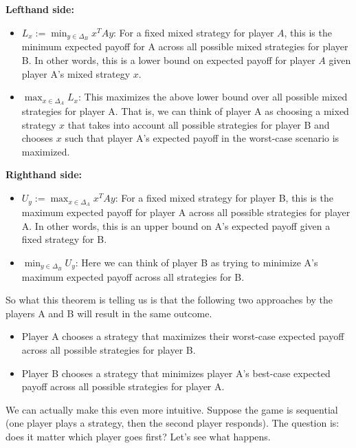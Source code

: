 \documentclass[12pt]{article}
\begin{document}
\bigskip

\textbf{Lefthand side:}
\begin{itemize}
\item $L_x := \min_{y \in \Delta_B} x^T A y$: For a fixed mixed strategy for player $A$, this is the minimum expected payoff for A across all possible mixed strategies for player B.  
In other words, this is a lower bound on expected payoff for player $A$ given player A's mixed strategy $x$. 
\item $\max_{x \in \Delta_A} L_x$: This maximizes the above lower bound over all possible mixed strategies for player A.  That is, we can think of player A as choosing a mixed strategy 
$x$ that takes into account all possible strategies for player B and chooses $x$ such that player A's expected payoff in the worst-case scenario is maximized. 
\end{itemize}

\bigskip

\textbf{Righthand side:}
\begin{itemize}
\item $U_y := \max_{x \in \Delta_A} x^T A y$: For a fixed mixed strategy for player B, this is the maximum expected payoff for player A across all possible strategies for player A. In other words, 
this is an upper bound on A's expected payoff given a fixed strategy for B. 
\item $\min_{y \in \Delta_B} U_y$: Here we can think of player B as trying to minimize A's maximum expected payoff across all strategies for B. 
\end{itemize}

So what this theorem is telling us is that the following two approaches by the players A and B will result in the same outcome. 
\begin{itemize}
\item Player A chooses a strategy that maximizes their worst-case expected payoff across all possible strategies for player B. 
\item Player B chooses a strategy that minimizes player A's best-case expected payoff across all possible strategies for player A. 
\end{itemize}

We can actually make this even more intuitive. Suppose the game is sequential (one player plays a strategy, then the second player responds). The question is: does it matter 
which player goes first? Let's see what happens. 

\bigskip
\end{document}
